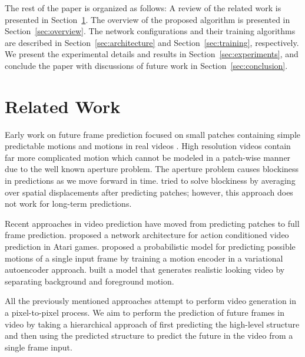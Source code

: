 \documentclass{article}
\newcommand{\cutsectionup}{\vspace*{-0.1in}}
\newcommand{\cutsectiondown}{\vspace*{-0.05in}}
\newcommand{\cutsectionup}{}
\newcommand{\cutsectiondown}{}
\begin{document}
The rest of the paper is organized as follows:
A review of the related work is presented in Section~\ref{sec:relatedwork}.
The overview of the proposed algorithm is presented in Section~\ref{sec:overview}. 
The network configurations and their training algorithms are described in Section~\ref{sec:architecture} and Section~\ref{sec:training}, respectively.
We present the experimental details and results in Section~\ref{sec:experiments}, and conclude the paper with discussions of future work in Section~\ref{sec:conclusion}.

\cutsectionup\section{Related Work}\label{sec:relatedwork}\cutsectiondown%
Early work on future frame prediction focused on small patches containing simple predictable motions \cite{NIPS2008_3567, michalski_grammar_cells,icml2014c2_mittelman14} and motions in real videos \cite{Ranzato14, Srivastava15}.
High resolution videos contain far more complicated motion which cannot be modeled in a patch-wise manner due to the well known aperture problem.
The aperture problem causes blockiness in predictions as we move forward in time.
\citet{Ranzato14} tried to solve blockiness by averaging over spatial displacements after predicting patches; however, this approach does not work for long-term predictions.

Recent approaches in video prediction have moved from predicting patches to full frame prediction.
\citet{Oh15} proposed a network architecture for action conditioned video prediction in Atari games.
\citet{visualdynamics16} proposed a probabilistic model for predicting possible motions of a single input frame by training a motion encoder in a variational autoencoder approach.
\citet{Vondrick16} built a model that generates realistic looking video by separating background and foreground motion.

All the previously mentioned approaches attempt to perform video generation in a pixel-to-pixel process.
We aim to perform the prediction of future frames in video by taking a hierarchical approach of first predicting the high-level structure and then using the predicted structure to predict the future in the video from a single frame input.
\end{document}
